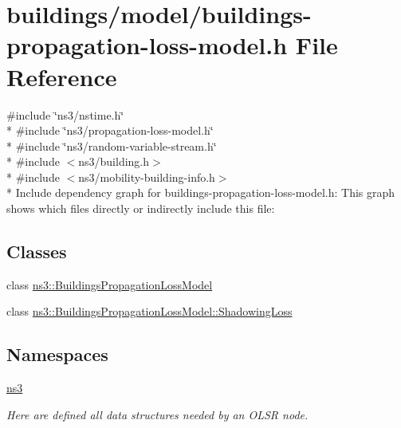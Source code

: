 \hypertarget{buildings-propagation-loss-model_8h}{}\section{buildings/model/buildings-\/propagation-\/loss-\/model.h File Reference}
\label{buildings-propagation-loss-model_8h}
{\ttfamily \#include \char`\"{}ns3/nstime.\+h\char`\"{}}\\*
{\ttfamily \#include \char`\"{}ns3/propagation-\/loss-\/model.\+h\char`\"{}}\\*
{\ttfamily \#include \char`\"{}ns3/random-\/variable-\/stream.\+h\char`\"{}}\\*
{\ttfamily \#include $<$ns3/building.\+h$>$}\\*
{\ttfamily \#include $<$ns3/mobility-\/building-\/info.\+h$>$}\\*
Include dependency graph for buildings-\/propagation-\/loss-\/model.h\+:
This graph shows which files directly or indirectly include this file\+:
\subsection*{Classes}
\begin{DoxyCompactItemize}
\item 
class \hyperlink{classns3_1_1BuildingsPropagationLossModel}{ns3\+::\+Buildings\+Propagation\+Loss\+Model}
\item 
class \hyperlink{classns3_1_1BuildingsPropagationLossModel_1_1ShadowingLoss}{ns3\+::\+Buildings\+Propagation\+Loss\+Model\+::\+Shadowing\+Loss}
\end{DoxyCompactItemize}
\subsection*{Namespaces}
\begin{DoxyCompactItemize}
\item 
 \hyperlink{namespacens3}{ns3}
\begin{DoxyCompactList}\small\item\em Here are defined all data structures needed by an O\+L\+SR node. \end{DoxyCompactList}\end{DoxyCompactItemize}
